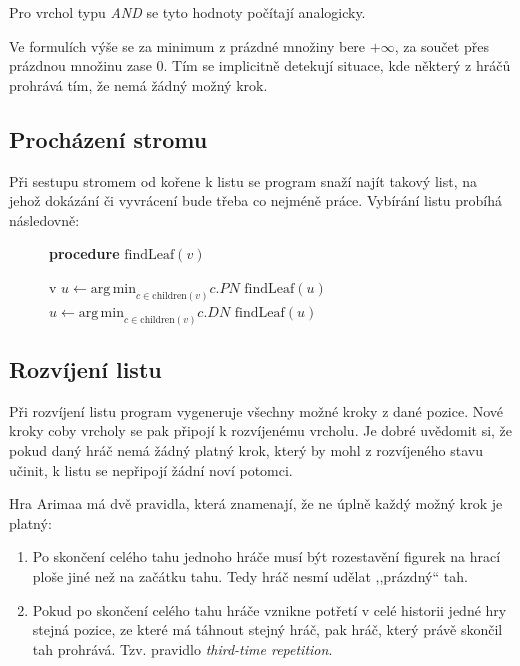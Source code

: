 \documentclass{article}
\begin{document}
Pro vrchol typu \emph{AND} se tyto hodnoty počítají analogicky.

Ve formulích výše se za minimum z prázdné množiny bere $+\infty$, za součet přes
prázdnou množinu zase $0$. Tím se implicitně detekují situace, kde některý z
hráčů prohrává tím, že nemá žádný možný krok.

\subsection{Procházení stromu}
Při sestupu stromem od kořene k listu se program snaží najít takový list, na
jehož dokázání či vyvrácení bude třeba co nejméně práce. Vybírání listu probíhá 
následovně:

\begin{figure}[H]
{\bf procedure} $\text{findLeaf}(v)$
\begin{algorithmic}
     v
    \STATE $u \gets \mathrm{arg\, min}_{c \in \mathrm{children}(v)} c.PN$
     $\text{findLeaf}(u)$
  \ELSE
    \STATE $u \gets \mathrm{arg\, min}_{c \in \mathrm{children}(v)} c.DN$
     $\text{findLeaf}(u)$
  \ENDIF
\end{algorithmic}
\end{figure}

\subsection{Rozvíjení listu}
Při rozvíjení listu program vygeneruje všechny možné kroky z dané pozice. Nové 
kroky coby vrcholy se pak připojí k rozvíjenému vrcholu. Je dobré uvědomit si, 
že pokud daný hráč nemá žádný platný krok, který by mohl z rozvíjeného stavu
učinit, k listu se nepřipojí žádní noví potomci.

Hra Arimaa má dvě pravidla, která znamenají, že ne úplně každý možný krok je 
platný:
\begin{enumerate}
\item Po skončení celého tahu jednoho hráče musí být rozestavění figurek na
  hrací ploše jiné než na začátku tahu. Tedy hráč nesmí udělat ,,prázdný`` tah.
\item Pokud po skončení celého tahu hráče vznikne potřetí v celé historii
  jedné hry stejná pozice, ze které má táhnout stejný hráč, pak hráč, který 
  právě skončil tah prohrává. Tzv. pravidlo \emph{third-time repetition}.
\end{enumerate}
\end{document}
